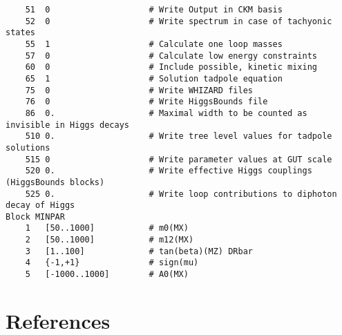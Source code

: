 \documentclass[final,3p,11pt,pdflatex]{elsarticle}
\begin{document}
\begin{lstlisting}
    51  0                    # Write Output in CKM basis
    52  0                    # Write spectrum in case of tachyonic states
    55  1                    # Calculate one loop masses
    57  0                    # Calculate low energy constraints
    60  0                    # Include possible, kinetic mixing
    65  1                    # Solution tadpole equation
    75  0                    # Write WHIZARD files
    76  0                    # Write HiggsBounds file
    86  0.                   # Maximal width to be counted as invisible in Higgs decays
    510 0.                   # Write tree level values for tadpole solutions
    515 0                    # Write parameter values at GUT scale
    520 0.                   # Write effective Higgs couplings (HiggsBounds blocks)
    525 0.                   # Write loop contributions to diphoton decay of Higgs
Block MINPAR
    1   [50..1000]           # m0(MX)
    2   [50..1000]           # m12(MX)
    3   [1..100]             # tan(beta)(MZ) DRbar
    4   {-1,+1}              # sign(mu)
    5   [-1000..1000]        # A0(MX)
\end{lstlisting}

\clearpage
\section*{References}
\end{document}
